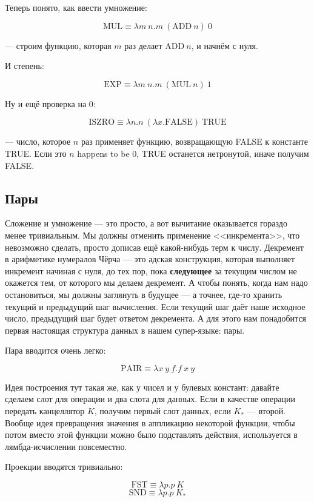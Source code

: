 \documentclass[a5paper]{article}
\begin{document}
Теперь понято, как ввести умножение:

$$\mbox{MUL} \equiv \lambda m\ n.m\ (\mbox{ADD}\ n)\ 0$$

--- строим функцию, которая $m$ раз делает $\mbox{ADD}\ n$, и начнём с нуля.

И степень:

$$\mbox{EXP} \equiv \lambda m\ n.m\ (\mbox{MUL}\ n)\ 1$$

Ну и ещё проверка на 0:

$$\mbox{ISZRO} \equiv \lambda n.n\ (\lambda x.\mbox{FALSE})\ \mbox{TRUE}$$

--- число, которое $n$ раз применяет функцию, возвращающую FALSE к константе TRUE. Если это $n$ happens to be 0, TRUE останется нетронутой, иначе получим FALSE.

\subsection{Пары}

Сложение и умножение --- это просто, а вот вычитание оказывается гораздо менее тривиальным. Мы должны отменить применение <<инкремента>>, что невозможно сделать, просто дописав ещё какой-нибудь терм к числу. Декремент в арифметике нумералов Чёрча --- это адская конструкция, которая выполняет инкремент начиная с нуля, до тех пор, пока \textbf{следующее} за текущим числом не окажется тем, от которого мы делаем декремент. А чтобы понять, когда нам надо остановиться, мы должны заглянуть в будущее --- а точнее, где-то хранить текущий и предыдущий шаг вычисления. Если текущий шаг даёт наше исходное число, предыдущий шаг будет ответом декремента. А для этого нам понадобится первая настоящая структура данных в нашем супер-языке: пары.

Пара вводится очень легко: 

$$\mbox{PAIR} \equiv \lambda x\ y\ f.f\ x\ y$$

Идея построения тут такая же, как у чисел и у булевых констант: давайте сделаем слот для операции и два слота для данных. Если в качестве операции передать канцеллятор $K$, получим первый слот данных, если $K_\ast$ --- второй. Вообще идея превращения значения в аппликацию некоторой функции, чтобы потом вместо этой функции можно было подставлять действия,  используется в лямбда-исчислении повсеместно.

Проекции вводятся тривиально:

$$\mbox{FST} \equiv \lambda p.p\ K$$
$$\mbox{SND} \equiv \lambda p.p\ K_\ast$$
\end{document}
